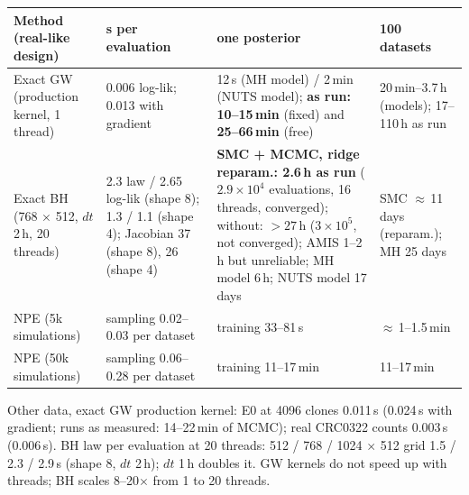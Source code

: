 \documentclass[10pt,a4paper]{article}
\newcommand{\code}[1]{\texttt{\detokenize{#1}}}
\newcommand{\blk}[1]{\par\needspace{5\baselineskip}\smallskip{\sffamily\bfseries\color{inkgray}#1}\par}
\newcommand{\Comment}{\blk{Comment}}
\renewcommand{\blk}[1]{\par\Needspace*{5\baselineskip}\smallskip{\sffamily\bfseries\color{inkgray}#1}\par}
\begin{document}
\begin{center}\footnotesize\setlength{\tabcolsep}{3.5pt}
\begin{tabularx}{\linewidth}{@{}p{3.4cm}YYY@{}}\toprule
Method (real-like design) & s per evaluation & one posterior & 100 datasets \\\midrule
Exact GW (production kernel, 1 thread) & 0.006 log-lik; 0.013 with gradient & 12\,s (MH model) / 2\,min (NUTS model); \textbf{as run: 10--15\,min} (fixed) and \textbf{25--66\,min} (free) & 20\,min--3.7\,h (models); 17--110\,h as run \\
Exact BH (768 $\times$ 512, $dt$ 2\,h, 20 threads) & 2.3 law / 2.65 log-lik (shape 8); 1.3 / 1.1 (shape 4); Jacobian 37 (shape 8), 26 (shape 4) & \textbf{SMC + MCMC, ridge reparam.: 2.6\,h as run} ($2.9\times10^4$ evaluations, 16 threads, converged); without: $>27$\,h ($3\times10^5$, not converged); AMIS 1--2\,h but unreliable; MH model 6\,h; NUTS model 17 days & SMC $\approx$\,11 days (reparam.); MH 25 days \\
NPE \code{dev} (5k simulations) & sampling 0.02--0.03 per dataset & training 33--81\,s & $\approx$\,1--1.5\,min \\
NPE \code{full} (50k simulations) & sampling 0.06--0.28 per dataset & training 11--17\,min & 11--17\,min \\\bottomrule
\end{tabularx}

Other data, exact GW production kernel: E0 at 4096 clones 0.011\,s (0.024\,s with gradient; runs as measured: 14--22\,min of MCMC); real CRC0322 counts 0.003\,s (0.006\,s). BH law per evaluation at 20 threads: 512 / 768 / 1024 $\times$ 512 grid 1.5 / 2.3 / 2.9\,s (shape 8, $dt$ 2\,h); $dt$ 1\,h doubles it. GW kernels do not speed up with threads; BH scales 8--20$\times$ from 1 to 20 threads.
\end{center}
\Comment
\end{document}

